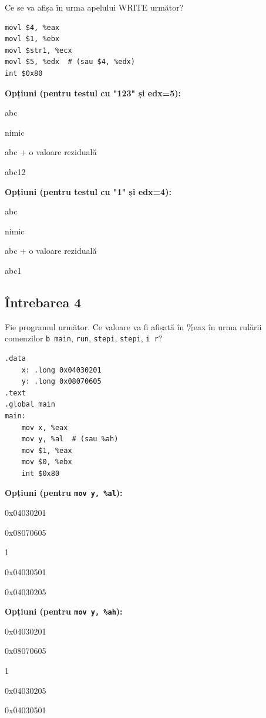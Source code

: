 \documentclass[12pt,a4paper]{article}
\begin{document}
Ce se va afișa în urma apelului WRITE următor?
\begin{lstlisting}[language=x86asm]
movl $4, %eax
movl $1, %ebx
movl $str1, %ecx
movl $5, %edx  # (sau $4, %edx)
int $0x80
\end{lstlisting}

\textbf{Opțiuni (pentru testul cu "123" și edx=5):}
\begin{itemize*}
    \item abc
    \item nimic
    \item abc + o valoare reziduală
    \item abc12 
\end{itemize*}

\textbf{Opțiuni (pentru testul cu "1" și edx=4):}
\begin{itemize*}
    \item abc
    \item nimic
    \item abc + o valoare reziduală
    \item abc1 
\end{itemize*}

\subsection*{Întrebarea 4}
Fie programul următor. Ce valoare va fi afișată în \%eax în urma rulării comenzilor \texttt{b main}, \texttt{run}, \texttt{stepi}, \texttt{stepi}, \texttt{i r}?

\begin{lstlisting}[language=x86asm, caption={Cod Sursa (Lab 2.1/2.2)}]
.data
    x: .long 0x04030201
    y: .long 0x08070605
.text
.global main
main:
    mov x, %eax
    mov y, %al  # (sau %ah)
    mov $1, %eax
    mov $0, %ebx
    int $0x80
\end{lstlisting}

\textbf{Opțiuni (pentru \texttt{mov y, \%al}):}
\begin{itemize*}
    \item 0x04030201
    \item 0x08070605
    \item 1
    \item 0x04030501
    \item 0x04030205 
\end{itemize*}

\textbf{Opțiuni (pentru \texttt{mov y, \%ah}):}
\begin{itemize*}
    \item 0x04030201
    \item 0x08070605
    \item 1
    \item 0x04030205
    \item 0x04030501 
\end{itemize*}
\end{document}
